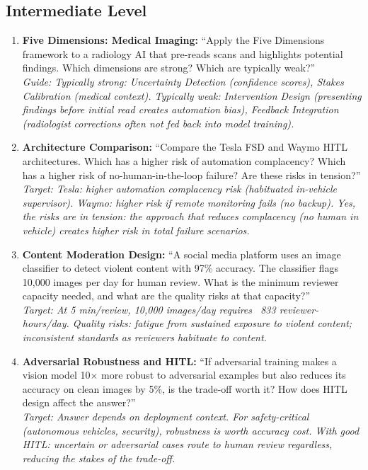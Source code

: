 \subsection{Intermediate Level}

\begin{enumerate}
    \item \textbf{Five Dimensions: Medical Imaging:} ``Apply the Five Dimensions framework to a radiology AI that pre-reads scans and highlights potential findings. Which dimensions are strong? Which are typically weak?''\\
    \textit{Guide: Typically strong: Uncertainty Detection (confidence scores), Stakes Calibration (medical context). Typically weak: Intervention Design (presenting findings before initial read creates automation bias), Feedback Integration (radiologist corrections often not fed back into model training).}

    \item \textbf{Architecture Comparison:} ``Compare the Tesla FSD and Waymo HITL architectures. Which has a higher risk of automation complacency? Which has a higher risk of no-human-in-the-loop failure? Are these risks in tension?''\\
    \textit{Target: Tesla: higher automation complacency risk (habituated in-vehicle supervisor). Waymo: higher risk if remote monitoring fails (no backup). Yes, the risks are in tension: the approach that reduces complacency (no human in vehicle) creates higher risk in total failure scenarios.}

    \item \textbf{Content Moderation Design:} ``A social media platform uses an image classifier to detect violent content with 97\% accuracy. The classifier flags 10,000 images per day for human review. What is the minimum reviewer capacity needed, and what are the quality risks at that capacity?''\\
    \textit{Target: At 5 min/review, 10,000 images/day requires ~833 reviewer-hours/day. Quality risks: fatigue from sustained exposure to violent content; inconsistent standards as reviewers habituate to content.}

    \item \textbf{Adversarial Robustness and HITL:} ``If adversarial training makes a vision model 10$\times$ more robust to adversarial examples but also reduces its accuracy on clean images by 5\%, is the trade-off worth it? How does HITL design affect the answer?''\\
    \textit{Target: Answer depends on deployment context. For safety-critical (autonomous vehicles, security), robustness is worth accuracy cost. With good HITL: uncertain or adversarial cases route to human review regardless, reducing the stakes of the trade-off.}
\end{enumerate}

